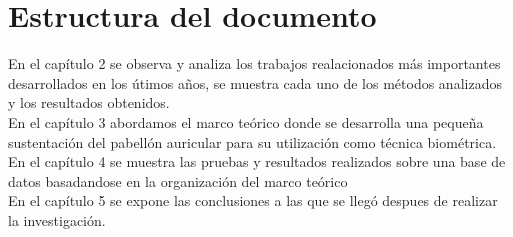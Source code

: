 \section{Estructura del documento}
En el capítulo 2 se observa y analiza los trabajos realacionados más importantes
desarrollados en los útimos años, se muestra cada uno de los métodos analizados y los
resultados obtenidos.\\
En el capítulo 3 abordamos el marco teórico donde se desarrolla una pequeña sustentación del pabellón auricular para su utilización como técnica biométrica.\\
En el capítulo 4 se muestra las pruebas y resultados realizados sobre una base de
datos basadandose en la organización del marco teórico\\
En el capítulo 5 se expone las conclusiones a las que se llegó despues de realizar la
investigación.
